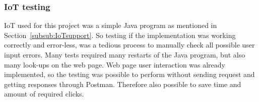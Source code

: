 \subsubsection{IoT testing}
IoT used for this project was a simple Java program as mentioned in Section~\ref{subsub:IoTsupport}. So testing if the implementation was working correctly and error-less, was a tedious process to manually check all possible user input errors. Many tests required many restarts of the Java program, but also many look-ups on the web page. Web page user interaction was already implemented, so the testing was possible to perform without sending request and getting responses through Postman. Therefore also possible to save time and amount of required clicks.